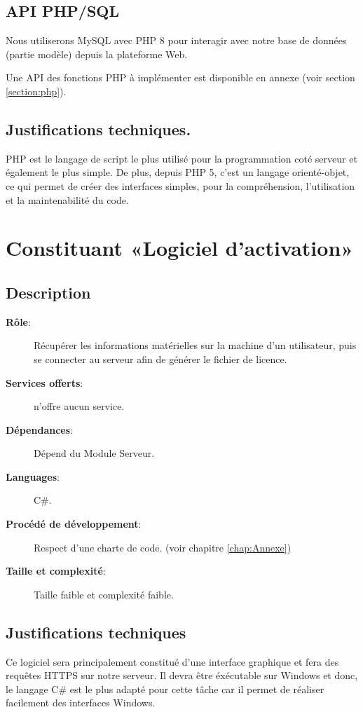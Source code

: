 \subsection{API PHP/SQL}
Nous utiliserons MySQL avec PHP 8 pour interagir avec notre base de données (partie modèle) depuis la plateforme Web.

Une API des fonctions PHP à implémenter est disponible en annexe (voir section \ref{section:php}).

\subsection{Justifications techniques.}
PHP est le langage de script le plus utilisé pour la programmation coté serveur et également le plus simple.
De plus, depuis PHP 5, c'est un langage orienté-objet, ce qui permet de créer des interfaces simples, pour la
compréhension, l'utilisation et la maintenabilité du code.

\section{Constituant «Logiciel d'activation»}
\subsection{Description}
\begin{description}
	\item[\textbf{Rôle}:]
		Récupérer les informations matérielles sur la machine d'un utilisateur, puis 
		se connecter au serveur afin de générer le fichier de licence.
	\item[\textbf{Services offerts}:] 
		n'offre aucun service.
	\item[\textbf{Dépendances}:]
		Dépend du Module Serveur.
	\item[\textbf{Languages}:]
		C\#.
	\item[\textbf{Procédé de développement}:]
		Respect d'une charte de code. (voir chapitre \ref{chap:Annexe})
	\item[\textbf{Taille et complexité}:]
		Taille faible et complexité faible. 
\end{description}

\subsection{Justifications techniques}
Ce logiciel sera principalement constitué d'une interface graphique et fera des requêtes HTTPS sur notre serveur.
Il devra être éxécutable sur Windows et donc, le langage C\# est le plus adapté pour cette tâche car il permet de
réaliser facilement des interfaces Windows.

